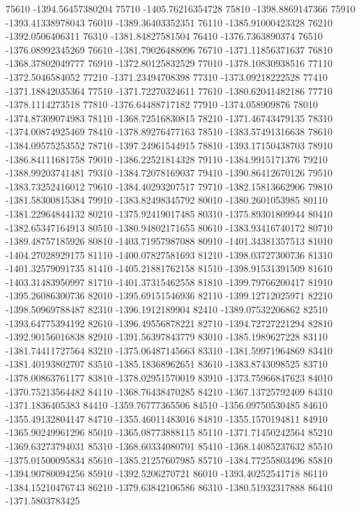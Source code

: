 {75610 -1394.56457380204
75710 -1405.76216354728
75810 -1398.8869147366
75910 -1393.41338978043
76010 -1389.36403352351
76110 -1385.91000423328
76210 -1392.0506406311
76310 -1381.84827581504
76410 -1376.7363890374
76510 -1376.08992345269
76610 -1381.79026488096
76710 -1371.11856371637
76810 -1368.37802049777
76910 -1372.80125832529
77010 -1378.10830938516
77110 -1372.5046584052
77210 -1371.23494708398
77310 -1373.09218222528
77410 -1371.18842035364
77510 -1371.72270324611
77610 -1380.62041482186
77710 -1378.1114273518
77810 -1376.64488717182
77910 -1374.058909876
78010 -1374.87309074983
78110 -1368.72516830815
78210 -1371.46743479135
78310 -1374.00874925469
78410 -1378.89276477163
78510 -1383.57491316638
78610 -1384.09575253552
78710 -1397.24961544915
78810 -1393.17150438703
78910 -1386.84111681758
79010 -1386.22521814328
79110 -1384.9915171376
79210 -1388.99203741481
79310 -1384.72078169037
79410 -1390.86412670126
79510 -1383.73252416012
79610 -1384.40293207517
79710 -1382.15813662906
79810 -1381.58300815384
79910 -1383.82498345792
80010 -1380.2601053985
80110 -1381.22964844132
80210 -1375.92419017485
80310 -1375.89301809944
80410 -1382.65347164913
80510 -1380.94802171655
80610 -1383.93416740172
80710 -1389.48757185926
80810 -1403.71957987088
80910 -1401.34381357513
81010 -1404.27028929175
81110 -1400.07827581693
81210 -1398.03727300736
81310 -1401.32579091735
81410 -1405.21881762158
81510 -1398.91531391509
81610 -1403.31483950997
81710 -1401.37315462558
81810 -1399.79766200417
81910 -1395.26086300736
82010 -1395.69151546936
82110 -1399.12712025971
82210 -1398.50969788487
82310 -1396.1912189904
82410 -1389.07532206862
82510 -1393.64775394192
82610 -1396.49556878221
82710 -1394.72727221294
82810 -1392.90156016838
82910 -1391.56397843779
83010 -1385.1989627228
83110 -1381.74411727564
83210 -1375.06487145663
83310 -1381.59971964869
83410 -1381.40193802707
83510 -1385.18368962651
83610 -1383.8743098525
83710 -1378.00863761177
83810 -1378.02951570019
83910 -1373.75966847623
84010 -1370.75213564482
84110 -1368.76438470285
84210 -1367.13725792409
84310 -1371.1836405383
84410 -1359.76777365506
84510 -1356.09750530485
84610 -1355.49132804147
84710 -1355.46011483016
84810 -1355.1570194811
84910 -1365.90249961296
85010 -1365.08773888115
85110 -1371.71450242564
85210 -1369.63273794031
85310 -1368.60334080701
85410 -1368.14085237632
85510 -1375.01500095834
85610 -1385.21257607985
85710 -1384.77255803496
85810 -1394.90780094256
85910 -1392.5206270721
86010 -1393.40252541718
86110 -1384.15210476743
86210 -1379.63842106586
86310 -1380.51932317888
86410 -1371.5803783425
}
